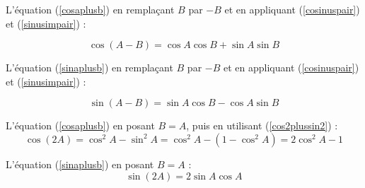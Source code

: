L'équation (\ref{cosaplusb}) en remplaçant $B$ par $-B$ et en appliquant (\ref{cosinuspair}) et (\ref{sinusimpair}) :

\begin{equation}
\cos(A-B) = \cos{A}\cos{B} + \sin{A}\sin{B}
\label{cosamoinsb}
\end{equation}

L'équation (\ref{sinaplusb}) en remplaçant $B$ par $-B$ et en appliquant (\ref{cosinuspair}) et (\ref{sinusimpair}) :

\begin{equation}
\sin(A-B) = \sin{A}\cos{B} - \cos{A}\sin{B}
\label{sinamoinsb}
\end{equation}

L'équation (\ref{cosaplusb}) en posant $B=A$, puis en utilisant (\ref{cos2plussin2}) :
\begin{equation}
\cos(2A) = \cos^2{A} - \sin^2{A} = \cos^2{A} - (1-\cos^2{A}) = 2\cos^2A-1
\label{cos2a}
\end{equation}

L'équation (\ref{sinaplusb}) en posant $B=A$ :
\begin{equation}
\sin(2A) = 2\sin{A}\cos{A}
\end{equation}
